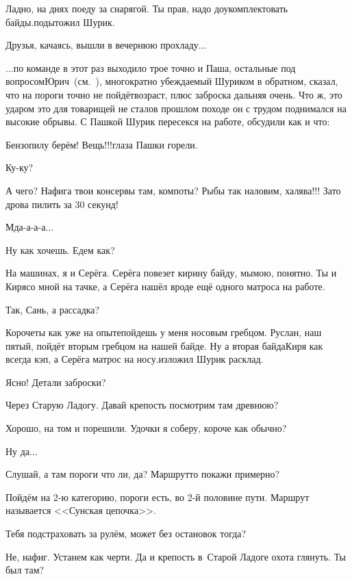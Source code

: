 \diagdash Ладно, на днях поеду за снарягой. Ты прав, надо доукомплектовать байды.\mdash подытожил Шурик.

Друзья, качаясь, вышли в вечернюю прохладу$\ldots$

\vspace{0.5cm}

$\ldots$по команде в этот раз выходило трое точно и Паша, остальные под вопросом\mdash Юрич~(см.~\cite{СоболевВепсскаяЛетопись}), многократно убеждаемый Шуриком в обратном, сказал, что на пороги точно не пойдёт\mdash возраст, плюс заброска дальняя очень. Что ж, это ударом это для товарищей не стало\mdash в прошлом походе он с трудом поднимался на высокие обрывы. С Пашкой Шурик пересекся на работе, обсудили как и что:

\diagdash Бензопилу берём! Вещь!!!\mdash глаза Пашки горели.

\diagdash Ку-ку?

\diagdash А чего? Нафига твои консервы там, компоты? Рыбы так наловим, халява!!! Зато дрова пилить за 30 секунд!

\diagdash Мда-а-а-а$\ldots$

\diagdash Ну как хочешь. Едем как?

\diagdash На машинах, я и Серёга. Серёга повезет кирину байду, мы\mdash мою, понятно. Ты и Киря\mdash со мной на тачке, а Серёга нашёл вроде ещё одного матроса на работе.

\diagdash Так, Сань, а рассадка?

\diagdash Короче\mdash ты как уже на опыте\mdash пойдешь у меня носовым гребцом. Руслан, наш пятый, пойдёт вторым гребцом на нашей байде. Ну а вторая байда\mdash Киря как всегда кэп, а Серёга матрос на носу.\mdash изложил Шурик расклад.

\diagdash Ясно! Детали заброски?

\diagdash Через Старую Ладогу. Давай крепость посмотрим там древнюю?

\diagdash Хорошо, на том и порешили. Удочки я соберу, короче как обычно?

\diagdash Ну да$\ldots$

\diagdash Слушай, а там пороги что ли, да? Маршрут\sdash то покажи примерно?

\diagdash Пойдём на 2-ю категорию, пороги есть, во 2-й половине пути. Маршрут называется <<Сунская цепочка>>.

\diagdash Тебя подстраховать за рулём, может без остановок тогда?

\diagdash Не, нафиг. Устанем как черти. Да и крепость в~Старой Ладоге охота глянуть. Ты был там?

